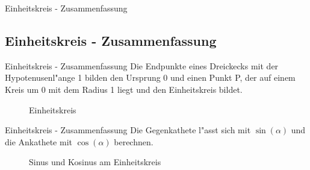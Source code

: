 \documentclass{standalone}
\begin{document}
\begin{frame}
  \begin{center}
    Einheitskreis - Zusammenfassung
  \end{center}
  \subsection{Einheitskreis - Zusammenfassung}
\end{frame}

\begin{frame}{Einheitskreis - Zusammenfassung}
  Die Endpunkte eines Dreickecks mit der Hypotenusenl{"a}nge 1 bilden den Ursprung 0 und einen Punkt P, der auf einem Kreis um 0 mit dem Radius 1 liegt und den Einheitskreis bildet.
  \begin{figure}[hb!]
    \center
    \def\svgwidth{150px}
    
    \caption{Einheitskreis}
    \label{fig:0_alpha_90_360_two}
  \end{figure}
\end{frame}

\begin{frame}{Einheitskreis - Zusammenfassung}
  Die Gegenkathete l{"a}sst sich mit $\sin(\alpha)$ und die Ankathete mit $\cos(\alpha)$ berechnen.
  \begin{figure}[hb!]
    \centering
    \def\svgwidth{150px}
    
    \caption{Sinus und Kosinus am Einheitskreis}
    \label{fig:sin_cos_einheitskreis_two}
  \end{figure}
\end{frame}
\end{document}
